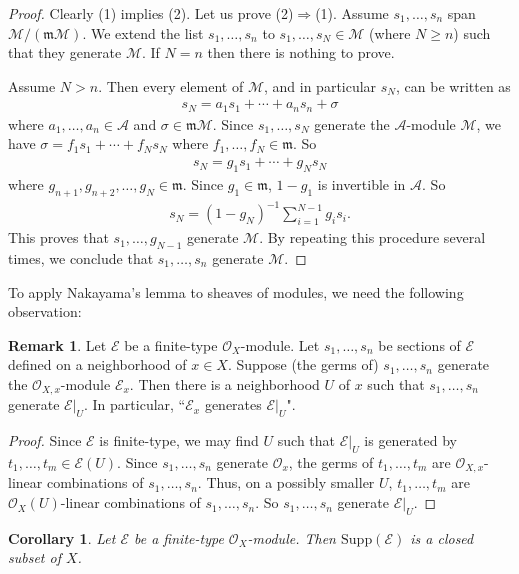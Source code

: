 \documentclass[12pt,b5paper,notitlepage]{report}
\theoremstyle{definition}
\newtheorem{rem}[df]{Remark}
\theoremstyle{plain}
\newtheorem{co}[df]{Corollary}
\newcommand{\mc}{\mathcal}
\newcommand{\scr}{\mathscr}
\newcommand{\Supp}{\mathrm{Supp}}
\newcommand{\mk}{\mathfrak m}
\numberwithin{equation}{section}
\begin{document}
\begin{proof}
Clearly (1) implies (2). Let us prove (2)$\Rightarrow$(1).  Assume $s_1,\dots,s_n$ span $\mc M/(\mk\mc M)$. We extend the list $s_1,\dots,s_n$ to $s_1,\dots,s_N\in\mc M$ (where $N\geq n$) such that they generate $\mc M$. If $N=n$ then there is nothing to prove.

Assume $N>n$. Then every element of $\mc M$, and in particular $s_N$,  can be written as
\begin{align*}
s_N=a_1s_1+\cdots+a_ns_n+\sigma
\end{align*}
where $a_1,\dots,a_n\in\mc A$ and $\sigma\in\mk\mc M$. Since $s_1,\dots,s_N$ generate the $\mc A$-module $\mc M$, we have $\sigma=f_1s_1+\cdots+f_Ns_N$ where $f_1,\dots,f_N\in\mk$. So
\begin{align*}
s_N=g_1s_1+\cdots+g_Ns_N
\end{align*}
where $g_{n+1},g_{n+2},\dots,g_N\in\mk$. Since $g_1\in\mk$, $1-g_1$ is invertible in $\mc A$. So
\begin{align*}
s_N=(1-g_N)^{-1}\sum_{i=1}^{N-1}g_is_i.
\end{align*}
This proves that $s_1,\dots,g_{N-1}$ generate $\mc M$. By repeating this procedure several times, we conclude that $s_1,\dots,s_n$ generate $\mc M$.
\end{proof}


To apply Nakayama's lemma to sheaves of modules, we need the following observation:
\begin{rem}\label{lb17}
Let $\scr E$ be a finite-type $\scr O_X$-module. Let $s_1,\dots,s_n$ be sections of $\scr E$ defined on a neighborhood of $x\in X$. Suppose (the germs of) $s_1,\dots,s_n$ generate the $\scr O_{X,x}$-module $\scr E_x$. Then there is a neighborhood $U$ of $x$ such that $s_1,\dots,s_n$ generate $\scr E|_U$. In particular, ``$\scr E_x$ generates $\scr E|_U$".
\end{rem}


\begin{proof}
Since $\scr E$ is finite-type, we may find $U$ such that $\scr E|_U$ is generated by $t_1,\dots,t_m\in\scr E(U)$. Since $s_1,\dots,s_n$ generate $\scr O_x$, the germs of $t_1,\dots,t_m$ are $\scr O_{X,x}$-linear combinations of $s_1,\dots,s_n$. Thus, on a possibly smaller $U$, $t_1,\dots,t_m$ are $\scr O_X(U)$-linear combinations of $s_1,\dots,s_n$. So $s_1,\dots,s_n$ generate $\scr E|_U$.
\end{proof}


\begin{co}\label{lb43}
Let $\scr E$ be a finite-type $\scr O_X$-module. Then $\Supp(\scr E)$ is a closed subset of $X$.
\end{co}
\end{document}
